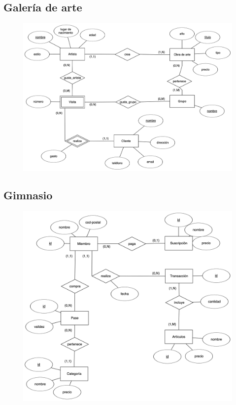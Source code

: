 \documentclass{db-practice}
\begin{document}
\subsection{Galería de arte}
\begin{figure}[H]
    \centering
    \includegraphics[width=\textwidth]{figs/modelado/ejercicio-6}
\end{figure}

\subsection{Gimnasio}
\begin{figure}[H]
    \centering
    \includegraphics[width=\textwidth]{figs/modelado/ejercicio-7}
\end{figure}
\end{document}
